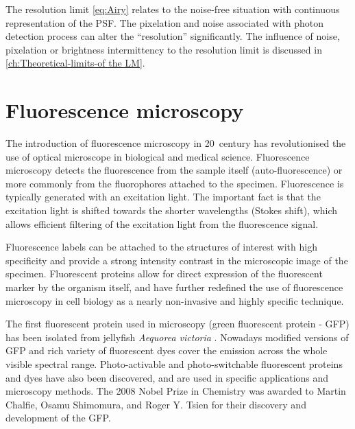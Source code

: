 The resolution limit \autoref{eq:Airy} relates to the noise-free situation with continuous representation of the PSF. The pixelation and noise associated with photon detection process can alter the ``resolution'' significantly. The influence of noise, pixelation or brightness intermittency to the resolution limit is discussed in \autoref{ch:Theoretical-limits-of the LM}. 




\section{Fluorescence microscopy\label{sec:Fluorescence microscopy}}

The introduction of fluorescence microscopy in 20\ths\ century has revolutionised the use of optical microscope in biological and medical science. Fluorescence microscopy detects the fluorescence from the sample itself (auto-fluorescence) or more commonly from the fluorophores attached to the specimen. Fluorescence is typically generated with an excitation light. The important fact is that the excitation light is shifted towards the shorter wavelengths (Stokes shift),  which allows efficient filtering of the excitation light from the fluorescence signal. 

Fluorescence labels can be attached to the structures of interest with high specificity and provide a strong intensity contrast in the microscopic image of the specimen. Fluorescent proteins allow for direct expression of the fluorescent marker by the organism itself, and have further redefined the use of fluorescence microscopy in cell biology as a nearly non-invasive and highly specific technique. 

 The first fluorescent protein used in microscopy (green fluorescent protein - GFP) has been isolated from jellyfish {\it Aequorea victoria} \cite{Tsien1998}. Nowadays modified versions of GFP and rich variety of fluorescent dyes cover the emission across the whole visible spectral range. Photo-activable and photo-switchable fluorescent proteins and dyes have also been discovered, and are used in specific applications and microscopy methods. The 2008 Nobel Prize in Chemistry was awarded to Martin Chalfie, Osamu Shimomura, and Roger Y. Tsien for their discovery and development of the GFP.
 
 

